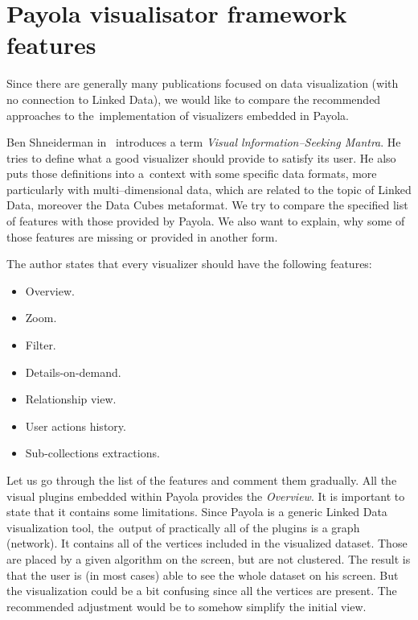 \section{Payola visualisator framework features}
\label{sec:rw:mantra}
Since there are generally many publications focused on data visualization (with no
connection to Linked Data), we would like to compare the recommended approaches to
the~implementation of visualizers embedded in Payola.

Ben Shneiderman in~\cite{mantra} introduces a term \emph{Visual lnformation--Seeking Mantra}.
He tries to define
what a good visualizer should provide to satisfy its user. He also puts those definitions into
a~context with some specific data formats, more particularly with multi--dimensional data,
which are related to the topic of Linked Data, moreover the Data Cubes metaformat. We try to
compare the specified list of features with those provided by Payola. We also want to explain,
why some of those features are missing or provided in another form.

The author states that every visualizer should have the following features:

\begin{itemize}
\item Overview.
\item Zoom.
\item Filter.
\item Details-on-demand.
\item Relationship view.
\item User actions history.
\item Sub-collections extractions.
\end{itemize}

Let us go through the list of the features and comment them gradually. All the visual plugins
embedded within Payola provides the \emph{Overview}. It is important to state
that it contains some limitations. Since Payola is a generic Linked Data visualization tool,
the~output of practically all of the plugins is a graph (network). It contains all of the vertices
included in the visualized dataset. Those are placed by a given algorithm on the screen,
but are not clustered. The result is that the user is (in most cases) able to see the whole
dataset on his screen. But the visualization could be a bit confusing since all the vertices
are present. The recommended adjustment would be to somehow simplify the initial view.

